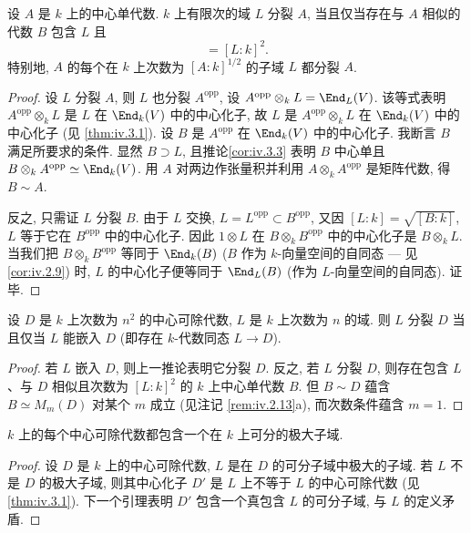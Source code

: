 \begin{corollary}\label{cor:iv.3.6}
设 $A$ 是 $k$ 上的中心单代数. $k$ 上有限次的域 $L$ 分裂 $A$, 当且仅当存在与 $A$ 相似的代数 $B$ 包含 $L$ 且
\begin{equation}
[B:k]=[L:k]^{2}.\tag{37}
\end{equation}
特别地, $A$ 的每个在 $k$ 上次数为 $[A:k]^{1/2}$ 的子域 $L$ 都分裂 $A$.
\end{corollary}

\begin{proof}
设 $L$ 分裂 $A$, 则 $L$ 也分裂 $A^{\mathrm{opp}}$, 设 $A^{\mathrm{opp}}\otimes_k L=\End_L(V)$. 该等式表明 $A^{\mathrm{opp}}\otimes_k L$ 是 $L$ 在 $\End_k(V)$ 中的中心化子, 故 $L$ 是 $A^{\mathrm{opp}}\otimes_k L$ 在 $\End_k(V)$ 中的中心化子 (见 \ref{thm:iv.3.1}). 设 $B$ 是 $A^{\mathrm{opp}}$ 在 $\End_k(V)$ 中的中心化子. 我断言 $B$ 满足所要求的条件. 显然 $B\supset L$, 且推论\ref{cor:iv.3.3} 表明 $B$ 中心单且 $B\otimes_k A^{\mathrm{opp}}\simeq\End_k(V)$. 用 $A$ 对两边作张量积并利用 $A\otimes_k A^{\mathrm{opp}}$ 是矩阵代数, 得 $B\sim A$.

反之, 只需证 $L$ 分裂 $B$. 由于 $L$ 交换, $L=L^{\mathrm{opp}}\subset B^{\mathrm{opp}}$, 又因 $[L:k]=\sqrt{[B:k]}$, $L$ 等于它在 $B^{\mathrm{opp}}$ 中的中心化子. 因此 $1\otimes L$ 在 $B\otimes_k B^{\mathrm{opp}}$ 中的中心化子是 $B\otimes_k L$. 当我们把 $B\otimes_k B^{\mathrm{opp}}$ 等同于 $\End_k(B)$ ($B$ 作为 $k$-向量空间的自同态 — 见 \ref{cor:iv.2.9}) 时, $L$ 的中心化子便等同于 $\End_L(B)$ (作为 $L$-向量空间的自同态). 证毕.
\end{proof}

\begin{corollary}\label{cor:iv.3.7}
设 $D$ 是 $k$ 上次数为 $n^2$ 的中心可除代数, $L$ 是 $k$ 上次数为 $n$ 的域. 则 $L$ 分裂 $D$ 当且仅当 $L$ 能嵌入 $D$ (即存在 $k$-代数同态 $L\to D$).
\end{corollary}

\begin{proof}
若 $L$ 嵌入 $D$, 则上一推论表明它分裂 $D$. 反之, 若 $L$ 分裂 $D$, 则存在包含 $L$、与 $D$ 相似且次数为 $[L:k]^2$ 的 $k$ 上中心单代数 $B$. 但 $B\sim D$ 蕴含 $B\simeq M_m(D)$ 对某个 $m$ 成立 (见注记 \ref{rem:iv.2.13}a), 而次数条件蕴含 $m=1$.
\end{proof}

\begin{proposition}\label{prop:iv.3.8}
$k$ 上的每个中心可除代数都包含一个在 $k$ 上可分的极大子域.
\end{proposition}

\begin{proof}
设 $D$ 是 $k$ 上的中心可除代数, $L$ 是在 $D$ 的可分子域中极大的子域. 若 $L$ 不是 $D$ 的极大子域, 则其中心化子 $D'$ 是 $L$ 上不等于 $L$ 的中心可除代数 (见 \ref{thm:iv.3.1}). 下一个引理表明 $D'$ 包含一个真包含 $L$ 的可分子域, 与 $L$ 的定义矛盾.
\end{proof}

